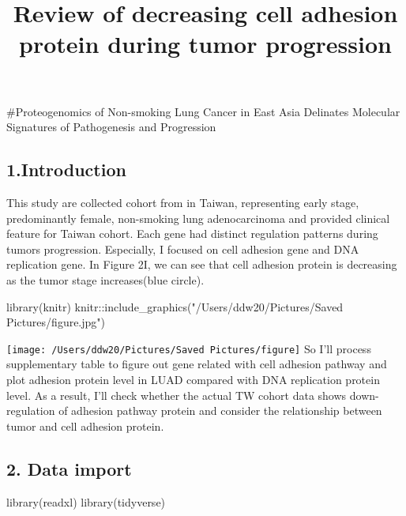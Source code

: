 \documentclass[
]{article}
\title{Review of decreasing cell adhesion protein during tumor
progression}
\author{}
\date{\vspace{-2.5em}}
\newenvironment{Shaded}{\begin{snugshade}}{\end{snugshade}}
\newcommand{\FunctionTok}[1]{\textcolor[rgb]{0.00,0.00,0.00}{#1}}
\newcommand{\NormalTok}[1]{#1}
\newcommand{\SpecialCharTok}[1]{\textcolor[rgb]{0.00,0.00,0.00}{#1}}
\newcommand{\StringTok}[1]{\textcolor[rgb]{0.31,0.60,0.02}{#1}}
\begin{document}
\maketitle

\#Proteogenomics of Non-smoking Lung Cancer in East Asia Delinates
Molecular Signatures of Pathogenesis and Progression

\hypertarget{introduction}{%
\subsection{1.Introduction}\label{introduction}}

This study are collected cohort from in Taiwan, representing early
stage, predominantly female, non-smoking lung adenocarcinoma and
provided clinical feature for Taiwan cohort. Each gene had distinct
regulation patterns during tumors progression. Especially, I focused on
cell adhesion gene and DNA replication gene. In Figure 2I, we can see
that cell adhesion protein is decreasing as the tumor stage
increases(blue circle).

\begin{Shaded}
\begin{Highlighting}[]
\FunctionTok{library}\NormalTok{(knitr)}
\NormalTok{knitr}\SpecialCharTok{::}\FunctionTok{include\_graphics}\NormalTok{(}\StringTok{"/Users/ddw20/Pictures/Saved Pictures/figure.jpg"}\NormalTok{)}
\end{Highlighting}
\end{Shaded}

\texttt{[image: /Users/ddw20/Pictures/Saved Pictures/figure]}
So I'll process supplementary table to figure out gene related with cell
adhesion pathway and plot adhesion protein level in LUAD compared with
DNA replication protein level. As a result, I'll check whether the
actual TW cohort data shows down-regulation of adhesion pathway protein
and consider the relationship between tumor and cell adhesion protein.

\hypertarget{data-import}{%
\subsection{2. Data import}\label{data-import}}

\begin{Shaded}
\begin{Highlighting}[]
\FunctionTok{library}\NormalTok{(readxl)}
\FunctionTok{library}\NormalTok{(tidyverse)}
\end{Highlighting}
\end{Shaded}
\end{document}
